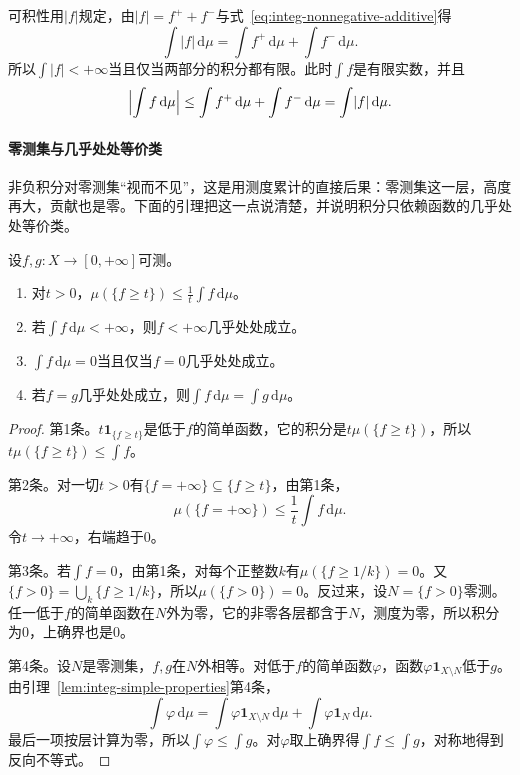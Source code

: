 可积性用$\lvert f\rvert$规定，由$\lvert f\rvert=f^++f^-$与式~\eqref{eq:integ-nonnegative-additive}得
\[
 \int\lvert f\rvert\,\mathrm d\mu=\int f^+\,\mathrm d\mu+\int f^-\,\mathrm d\mu .
\]
所以$\int\lvert f\rvert<+\infty$当且仅当两部分的积分都有限。此时$\int f$是有限实数，并且
\[
 \Bigl\lvert\int f\,\mathrm d\mu\Bigr\rvert\leq\int f^+\,\mathrm d\mu+\int f^-\,\mathrm d\mu=\int\lvert f\rvert\,\mathrm d\mu .
\]

\paragraph{零测集与几乎处处等价类}
非负积分对零测集“视而不见”，这是用测度累计的直接后果：零测集这一层，高度再大，贡献也是零。下面的引理把这一点说清楚，并说明积分只依赖函数的几乎处处等价类。

\begin{lemma}[非负积分与零测集]
\label{lem:integ-null-sets}
设$f,g:X\to[0,+\infty]$可测。
\begin{enumerate}
 \item 对$t>0$，$\mu(\{f\geq t\})\leq\frac1t\int f\,\mathrm d\mu$。
 \item 若$\int f\,\mathrm d\mu<+\infty$，则$f<+\infty$几乎处处成立。
 \item $\int f\,\mathrm d\mu=0$当且仅当$f=0$几乎处处成立。
 \item 若$f=g$几乎处处成立，则$\int f\,\mathrm d\mu=\int g\,\mathrm d\mu$。
\end{enumerate}
\end{lemma}

\begin{proof}
第1条。$t\mathbf 1_{\{f\geq t\}}$是低于$f$的简单函数，它的积分是$t\mu(\{f\geq t\})$，所以$t\mu(\{f\geq t\})\leq\int f$。

第2条。对一切$t>0$有$\{f=+\infty\}\subseteq\{f\geq t\}$，由第1条，
\[
 \mu(\{f=+\infty\})\leq\frac1t\int f\,\mathrm d\mu .
\]
令$t\to+\infty$，右端趋于$0$。

第3条。若$\int f=0$，由第1条，对每个正整数$k$有$\mu(\{f\geq1/k\})=0$。又$\{f>0\}=\bigcup_k\{f\geq1/k\}$，所以$\mu(\{f>0\})=0$。反过来，设$N=\{f>0\}$零测。任一低于$f$的简单函数在$N$外为零，它的非零各层都含于$N$，测度为零，所以积分为$0$，上确界也是$0$。

第4条。设$N$是零测集，$f,g$在$N$外相等。对低于$f$的简单函数$\varphi$，函数$\varphi\mathbf 1_{X\setminus N}$低于$g$。由引理~\ref{lem:integ-simple-properties}第4条，
\[
 \int\varphi\,\mathrm d\mu=\int\varphi\mathbf 1_{X\setminus N}\,\mathrm d\mu+\int\varphi\mathbf 1_N\,\mathrm d\mu .
\]
最后一项按层计算为零，所以$\int\varphi\leq\int g$。对$\varphi$取上确界得$\int f\leq\int g$，对称地得到反向不等式。
\end{proof}

